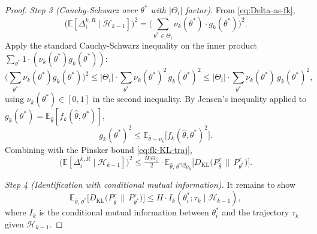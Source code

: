 \begin{proof}
\textit{Step 3 (Cauchy-Schwarz over $\theta^*$ with $|\Theta_i|$ factor).} From \eqref{eq:Delta-as-fk},
\begin{equation}
\big(\mathbb{E}[\Delta_i^{k,R} \mid \mathcal{H}_{k-1}]\big)^2 = \bigg(\sum_{\theta^* \in \Theta_i} \nu_k(\theta^*) \cdot g_k(\theta^*)\bigg)^2.
\end{equation}
Apply the standard Cauchy-Schwarz inequality on the inner product $\sum_{\theta^*} 1 \cdot (\nu_k(\theta^*) g_k(\theta^*))$:
\begin{equation}
\bigg(\sum_{\theta^*} \nu_k(\theta^*) g_k(\theta^*)\bigg)^2 \leq |\Theta_i| \cdot \sum_{\theta^*} \nu_k(\theta^*)^2 \, g_k(\theta^*)^2 \leq |\Theta_i| \cdot \sum_{\theta^*} \nu_k(\theta^*) \, g_k(\theta^*)^2,
\end{equation}
using $\nu_k(\theta^*) \in [0, 1]$ in the second inequality. By Jensen's inequality applied to $g_k(\theta^*) = \mathbb{E}_{\hat{\theta}}[f_k(\hat{\theta}, \theta^*)]$,
\begin{equation}
g_k(\theta^*)^2 \leq \mathbb{E}_{\hat{\theta} \sim \nu_k}\big[f_k(\hat{\theta}, \theta^*)^2\big].
\end{equation}
Combining with the Pinsker bound \eqref{eq:fk-KL-traj},
\begin{equation}
\label{eq:Delta-squared-bound}
\big(\mathbb{E}[\Delta_i^{k,R} \mid \mathcal{H}_{k-1}]\big)^2 \leq \tfrac{H |\Theta_i|}{2} \cdot \mathbb{E}_{\hat{\theta},\, \theta^* \overset{\text{iid}}{\sim} \nu_k}\big[D_{\mathrm{KL}}\big(P_{\hat{\theta}}^{\tau} \,\big\|\, P_{\theta^*}^{\tau}\big)\big].
\end{equation}

\textit{Step 4 (Identification with conditional mutual information).} It remains to show
\begin{equation}
\label{eq:KL-MI-bound}
\mathbb{E}_{\hat{\theta},\, \theta^*}\big[D_{\mathrm{KL}}\big(P_{\hat{\theta}}^{\tau} \,\big\|\, P_{\theta^*}^{\tau}\big)\big] \leq H \cdot I_k(\theta_i^*; \tau_k \mid \mathcal{H}_{k-1}),
\end{equation}
where $I_k$ is the conditional mutual information between $\theta_i^*$ and the trajectory $\tau_k$ given $\mathcal{H}_{k-1}$.


\end{proof}
